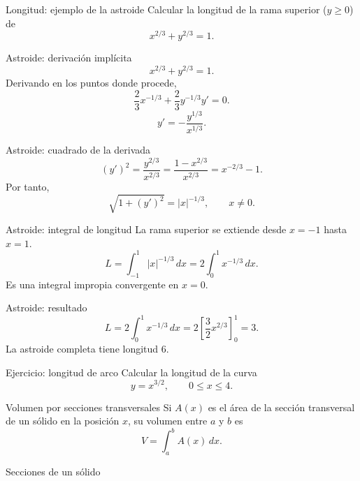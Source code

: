 \documentclass[main.tex]{subfiles}
\begin{document}
\begin{frame}{Longitud: ejemplo de la astroide}
Calcular la longitud de la rama superior ($y\ge0$) de\[x^{2/3}+y^{2/3}=1.\]
\end{frame}

\begin{frame}{Astroide: derivación implícita}
\[x^{2/3}+y^{2/3}=1.\]Derivando en los puntos donde procede,\[\frac23x^{-1/3}+\frac23y^{-1/3}y\prime=0.\]\[y\prime=-\frac{y^{1/3}}{x^{1/3}}.\]
\end{frame}

\begin{frame}{Astroide: cuadrado de la derivada}
\[(y\prime)^2=\frac{y^{2/3}}{x^{2/3}}=\frac{1-x^{2/3}}{x^{2/3}}=x^{-2/3}-1.\]Por tanto,\[\sqrt{1+(y\prime)^2}=|x|^{-1/3},\qquad x\ne0.\]
\end{frame}

\begin{frame}{Astroide: integral de longitud}
La rama superior se extiende desde $x=-1$ hasta $x=1$.\[L=\int_{-1}^1|x|^{-1/3}\,dx=2\int_0^1x^{-1/3}\,dx.\]Es una integral impropia convergente en $x=0$.
\end{frame}

\begin{frame}{Astroide: resultado}
\[L=2\int_0^1x^{-1/3}\,dx=2\left[\frac32x^{2/3}\right]_0^1=\boxed{3}.\]\footnotesize La astroide completa tiene longitud $6$.
\end{frame}

\begin{frame}{Ejercicio: longitud de arco}
Calcular la longitud de la curva\[y=x^{3/2},\qquad 0\le x\le4.\]
\end{frame}

\begin{frame}{Volumen por secciones transversales}
Si $A(x)$ es el área de la sección transversal de un sólido en la posición $x$, su volumen entre $a$ y $b$ es\[\boxed{V=\int_a^b A(x)\,dx.}\]
\end{frame}

\begin{frame}{Secciones de un sólido}
\end{frame}
\end{document}
